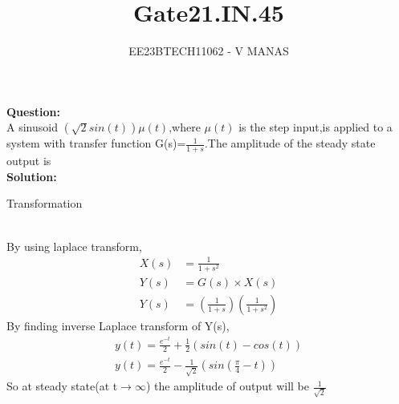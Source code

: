 \documentclass[journal,12pt,twocolumn]{IEEEtran}
\theoremstyle{remark}
\begin{document}

\vspace{3cm}

\title{Gate21.IN.45}
\author{EE23BTECH11062 - V MANAS}
\maketitle
\newpage

\bigskip
\textbf{Question:}\\A sinusoid $(\sqrt{2}sin(t))\mu(t)$,where $\mu(t)$ is the step input,is applied to a system with transfer function G(s)=$\frac{1}{1+s}$.The amplitude of the steady state output is\\
\textbf{Solution:}
\begin{table}[h]
    \centering
    
    \caption{Transformation}
    \label{tab:table_gate21.in.45}
\end{table}\\
By using laplace transform,
\begin{align}
    X(s)&=\frac{1}{1+s^2}\\
    Y(s)&=G(s)\times X(s)\\
    Y(s)&=(\frac{1}{1+s})(\frac{1}{1+s^2})
\end{align}
By finding inverse Laplace transform of Y(s),
\begin{align}
    y(t)=\frac{e^{-t}}{2}+\frac{1}{2}(sin(t)-cos(t))\\
    y(t)=\frac{e^{-t}}{2}-\frac{1}{\sqrt{2}}(sin(\frac{\pi}{4}-t))
\end{align}
So at steady state(at t$\rightarrow\infty$) the amplitude of output will be $\frac{1}{\sqrt{2}}$
\end{document}
